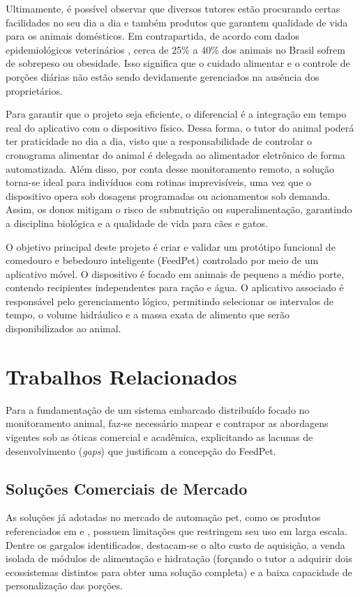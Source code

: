 \documentclass[12pt]{article}\usepackage{sbc-template}\usepackage{graphicx,url}\usepackage[utf8]{inputenc}
\begin{document}
Ultimamente, é possível observar que diversos tutores estão procurando certas facilidades no seu dia a dia e também produtos que garantem qualidade de vida para os animais domésticos. Em contrapartida, de acordo com dados epidemiológicos veterinários \cite{folha:23}, cerca de 25\% a 40\% dos animais no Brasil sofrem de sobrepeso ou obesidade. Isso significa que o cuidado alimentar e o controle de porções diárias não estão sendo devidamente gerenciados na ausência dos proprietários.

Para garantir que o projeto seja eficiente, o diferencial é a integração em tempo real do aplicativo com o dispositivo físico. Dessa forma, o tutor do animal poderá ter praticidade no dia a dia, visto que a responsabilidade de controlar o cronograma alimentar do animal é delegada ao alimentador eletrônico de forma automatizada. Além disso, por conta desse monitoramento remoto, a solução torna-se ideal para indivíduos com rotinas imprevisíveis, uma vez que o dispositivo opera sob dosagens programadas ou acionamentos sob demanda. Assim, os donos mitigam o risco de subnutrição ou superalimentação, garantindo a disciplina biológica e a qualidade de vida para cães e gatos.

O objetivo principal deste projeto é criar e validar um protótipo funcional de comedouro e bebedouro inteligente (FeedPet) controlado por meio de um aplicativo móvel. O dispositivo é focado em animais de pequeno a médio porte, contendo recipientes independentes para ração e água. O aplicativo associado é responsável pelo gerenciamento lógico, permitindo selecionar os intervalos de tempo, o volume hidráulico e a massa exata de alimento que serão disponibilizados ao animal.

\section{Trabalhos Relacionados}

Para a fundamentação de um sistema embarcado distribuído focado no monitoramento animal, faz-se necessário mapear e contrapor as abordagens vigentes sob as óticas comercial e acadêmica, explicitando as lacunas de desenvolvimento (\textit{gaps}) que justificam a concepção do FeedPet.

\subsection{Soluções Comerciais de Mercado}
As soluções já adotadas no mercado de automação pet, como os produtos referenciados em \cite{onizoomi:26} e \cite{surecare:26}, possuem limitações que restringem seu uso em larga escala. Dentre os gargalos identificados, destacam-se o alto custo de aquisição, a venda isolada de módulos de alimentação e hidratação (forçando o tutor a adquirir dois ecossistemas distintos para obter uma solução completa) e a baixa capacidade de personalização das porções. 
\end{document}
